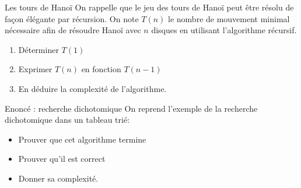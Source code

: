 \documentclass[10pt]{beamer}
\begin{document}
\begin{frame}[fragile]{\Ctitle}{\stitle}
	\begin{exampleblock}{Les tours de Hanoï}
		On rappelle que le jeu des tours de Hanoï peut être résolu de façon élégante par récursion. On note $T(n)$ le nombre de mouvement minimal nécessaire afin de résoudre Hanoï avec $n$ disques en utilisant l'algorithme récursif.
		\begin{enumerate}
			\item Déterminer $T(1)$
			\item Exprimer $T(n)$ en fonction $T(n-1)$
			\item En déduire la complexité de l'algorithme.
		\end{enumerate}
	\end{exampleblock}
\end{frame}



\begin{frame}[fragile]{\Ctitle}{\stitle}
	\begin{exampleblock}{Enoncé : recherche dichotomique}
		On reprend l'exemple de la recherche dichotomique dans un tableau trié:
		\begin{itemize}
			\item<2-> Prouver que cet algorithme termine
			\item<3-> Prouver qu'il est correct
			\item<4-> Donner sa complexité.
		\end{itemize}
	\end{exampleblock}
\end{frame}
\end{document}
